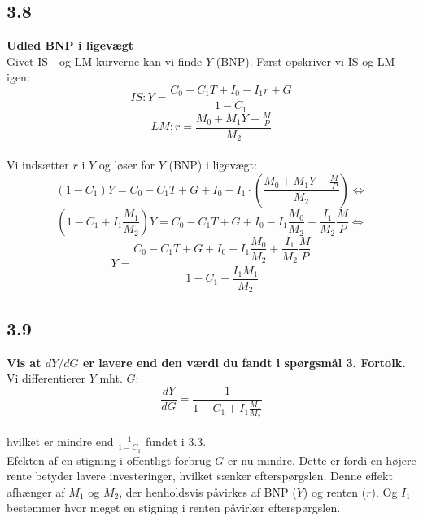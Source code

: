 \documentclass[a4paper, 12pt]{article}
\begin{document}
\subsection*{3.8}
\textbf{Udled BNP i ligevægt}
\\
Givet IS - og LM-kurverne kan vi finde $Y$ (BNP). Først opskriver vi IS og LM igen:
$$IS: Y=\dfrac{C_{0} - C_{1}T + I_{0} - I_{1}r + G}{1-C_{1}}$$
$$LM: r = \dfrac{M_{0}+M_{1}Y -\frac{M}{P}}{M_{2}} $$
\\
Vi indsætter $r$ i $Y$ og løser for $Y$ (BNP) i ligevægt:
$$ (1-C_{1})Y = C_{0} - C_{1}T + G + I_{0} - I_{1} \cdot \left(  \dfrac{M_{0}+M_{1}Y -\frac{M}{P}}{M_{2}} \right)  \Leftrightarrow$$
$$\left(1-C_{1} + I_{1} \frac{M_{1}}{M_{2}} \right)Y = C_{0} - C_{1}T + G + I_{0} - I_{1}\frac{M_{0}}{M_{2}} + \frac{I_{1}}{M_{2}}\frac{M}{P} \Leftrightarrow$$
$$Y = \dfrac{C_{0} - C_{1}T + G + I_{0} - I_{1}\dfrac{M_{0}}{M_{2}} + \dfrac{I_{1}}{M_{2}}\dfrac{M}{P}}{1 - C_{1} + \dfrac{I_{1}M_{1}}{M_{2}}}$$

\subsection*{3.9}
\textbf{Vis at $dY/dG$ er lavere end den værdi du fandt i spørgsmål 3. Fortolk.}
\\
Vi differentierer $Y$ mht. $G$:
$$\dfrac{dY}{dG} = \dfrac{1}{1 - C_{1} + I_{1} \frac{M_{1}}{M_{2}}}$$
\\
hvilket er mindre end $\frac{1}{1-C_{1}}$ fundet i 3.3.
\\
Efekten af en stigning i offentligt forbrug $G$ er nu mindre. Dette er fordi en højere rente betyder lavere investeringer, hvilket sænker efterspørgslen. Denne effekt afhænger af $M_{1}$ og $M_{2}$, der henholdsvis påvirkes af BNP ($Y$) og renten ($r$). Og $I_{1}$ bestemmer hvor meget en stigning i renten påvirker efterspørgslen.

\end{document}
